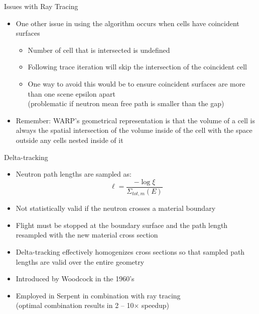 \documentclass[xcolor=x11names, compress]{beamer}
\renewcommand{\(}{\begin{columns}}
\renewcommand{\)}{\end{columns}}
\newcommand{\<}[1]{\begin{column}{#1}}
\renewcommand{\>}{\end{column}}
\begin{document}
\begin{frame}{Issues with Ray Tracing \cite{warp}}
	\begin{itemize}
	\item{One other issue in using the algorithm occurs when cells have coincident surfaces}
		\begin{itemize}
		\item{Number of cell that is intersected is undefined}
		\item{Following trace iteration will skip the intersection of the coincident cell}
		\item{One way to avoid this would be to ensure coincident surfaces are more than one scene
		epsilon apart \\(problematic if neutron mean free path is smaller than the gap)}
		\end{itemize}
	\pause
	\vspace*{1 em}
	\item{Remember: WARP's geometrical representation is that the volume of a
	cell is always the spatial intersection of the volume inside of the cell with the space outside
	any cells nested inside of it}
	\end{itemize}
\end{frame}


\begin{frame}{Delta-tracking}
	\begin{itemize}
	\item{Neutron path lengths are sampled as:}
		\begin{equation*}
		\ell = \frac{-\log\xi}{\Sigma_{tot,m}(E)}
		\end{equation*}
	\item{Not statistically valid if the neutron crosses a material boundary}
	\item{Flight must be stopped at the boundary surface and the path length resampled with the new 
	material cross section}
	\pause
	\vspace*{0.5 em}
	\item{Delta-tracking effectively homogenizes cross sections so that sampled path lengths are valid
	over the entire geometry}
	\item{Introduced by Woodcock in the 1960's}
	\item{Employed in Serpent in combination with ray tracing \cite{serpent} \\(optimal combination results in 2 -- 10$\times$ speedup)}
	\end{itemize}
\end{frame}
\end{document}
